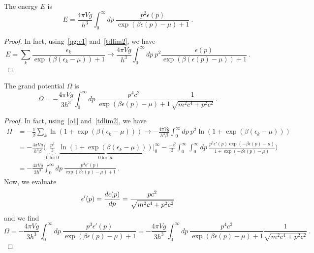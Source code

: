     The energy $E$ is 
    \begin{equation*}
        E = \frac{4 \pi V g}{h^3} \int_0^\infty dp ~ \frac{p^2 \epsilon(p)}{\exp(\beta \epsilon(p) - \mu) + 1} ~.
    \end{equation*}
    \begin{proof}
        In fact, using~\eqref{qg:e1} and~\eqref{tdlim2}, we have 
        \begin{equation}
            E = \sum_k \frac{\epsilon_k}{\exp(\beta(\epsilon_k - \mu)) + 1} \rightarrow \frac{4 \pi V g}{h^3} \int_0^\infty dp ~ p^2 \frac{\epsilon(p)}{\exp(\beta(\epsilon (p) - \mu)) + 1} ~.
        \end{equation}
    \end{proof}

    The grand potential $\Omega$ is 
    \begin{equation*}
        \Omega = - \frac{4 \pi V g}{3 h^3} \int_0^\infty dp ~ \frac{p^4 c^2}{\exp(\beta \epsilon(p) - \mu) + 1} \frac{1}{\sqrt{m^2 c^4 + p^2 c^2}} ~.
    \end{equation*}
    \begin{proof}
        In fact, using~\eqref{o1} and~\eqref{tdlim2}, we have 
        \begin{equation}
        \begin{aligned}
            \Omega & = - \frac{1}{\beta} \sum_k \ln (1 + \exp(\beta(\epsilon_k - \mu))) \rightarrow - \frac{4 \pi V g}{h^3 \beta} \int_0^\infty dp ~ p^2 \ln (1 + \exp(\beta(\epsilon_k - \mu))) \\ & = - \frac{4 \pi V g}{h^3 \beta} \Big ( \underbrace{ \frac{p^3}{3} }_{0 ~ \text{for} ~ 0} \underbrace{\ln (1 + \exp(\beta(\epsilon_k - \mu)))}_{0 ~ \text{for} ~ \infty}  \Big \vert_0^\infty - \frac{-\beta}{3} \int_0^\infty \int_0^\infty dp ~ \frac{p^3 \epsilon'(p) \exp(- \beta \epsilon(p) - \mu)}{1 + \exp(- \beta \epsilon(p) - \mu)} \Big ) \\ & = - \frac{4 \pi V g}{3 h^3} \int_0^\infty dp ~ \frac{p^3 \epsilon'(p)}{\exp(\beta \epsilon(p) - \mu) + 1} ~.
        \end{aligned}
        \end{equation}
        Now, we evaluate 
        \begin{equation}
            \epsilon'(p) = \frac{d\epsilon(p)}{dp} = \frac{p c^2}{\sqrt{m^2 c^4 + p^2 c^2}}
        \end{equation}
        and we find 
        \begin{equation}
            \Omega = - \frac{4 \pi V g}{3 h^3} \int_0^\infty dp ~ \frac{p^3 \epsilon'(p)}{\exp(\beta \epsilon(p) - \mu) + 1} = - \frac{4 \pi V g}{3 h^3} \int_0^\infty dp ~ \frac{p^4 c^2}{\exp(\beta \epsilon(p) - \mu) + 1} \frac{1}{\sqrt{m^2 c^4 + p^2 c^2}} ~.
        \end{equation}
    \end{proof}


